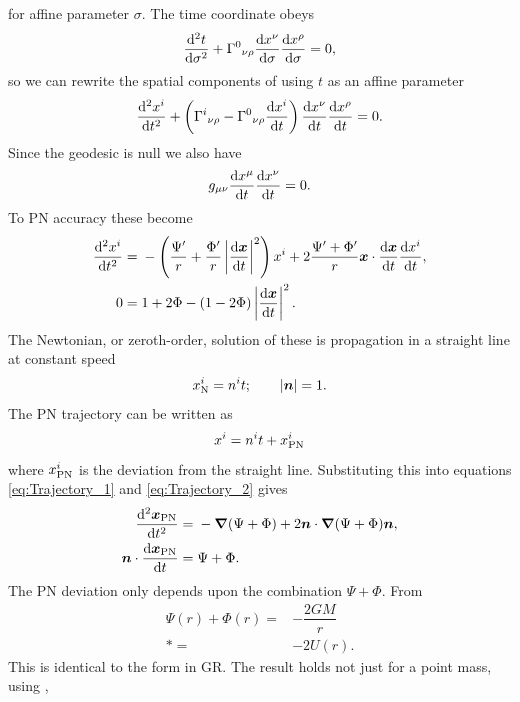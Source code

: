for affine parameter $\sigma$. The time coordinate obeys
\begin{equation}
\dfrac{\mathrm{d}^2 {t}}{\mathrm{d} {\sigma}^2} + {\Gamma^0}_{\nu\rho}\dfrac{\mathrm{d} {x^\nu}}{\mathrm{d} {\sigma}}\dfrac{\mathrm{d} {x^\rho}}{\mathrm{d} {\sigma}} = 0,
\end{equation}
so we can rewrite the spatial components of  using $t$ as an affine parameter \citep[section 6.1]{Will1993}
\begin{equation}
\dfrac{\mathrm{d}^2 {x^i}}{\mathrm{d} {t}^2} + \left({\Gamma^i}_{\nu\rho} - {\Gamma^0}_{\nu\rho}\dfrac{\mathrm{d} {x^i}}{\mathrm{d} {t}}\right)\dfrac{\mathrm{d} {x^\nu}}{\mathrm{d} {t}}\dfrac{\mathrm{d} {x^\rho}}{\mathrm{d} {t}} = 0.
\end{equation}
Since the geodesic is null we also have
\begin{equation}
g_{\mu\nu}\dfrac{\mathrm{d} {x^\mu}}{\mathrm{d} {t}}\dfrac{\mathrm{d} {x^\nu}}{\mathrm{d} {t}} = 0.
\end{equation}
To PN accuracy these become
\begin{align}
\label{eq:Trajectory_1}
\dfrac{\mathrm{d}^2 {x^i}}{\mathrm{d} {t}^2} = {} & -\left(\dfrac{\Psi'}{r} + \dfrac{\Phi'}{r}\left|\dfrac{\mathrm{d} {\boldsymbol{x}}}{\mathrm{d} {t}}\right|^2\right)x^i + 2\dfrac{\Psi' + \Phi'}{r}\boldsymbol{x}\cdot\dfrac{\mathrm{d} {\boldsymbol{x}}}{\mathrm{d} {t}}\dfrac{\mathrm{d} {x^i}}{\mathrm{d} {t}}, \\
0 = {} & 1 + 2\Phi - \left(1 - 2\Phi\right)\left|\dfrac{\mathrm{d} {\boldsymbol{x}}}{\mathrm{d} {t}}\right|^2.
\label{eq:Trajectory_2}
\end{align}
The Newtonian, or zeroth-order, solution of these is propagation in a straight line at constant speed \citep[section 6.1]{Will1993}
\begin{equation}
x^i_\mathrm{N} = n^it; \qquad |\boldsymbol{n}| = 1.
\end{equation}
The PN trajectory can be written as
\begin{equation}
x^i = n^it + x^i_\mathrm{PN}
\end{equation}
where $x^i_\mathrm{PN}$ is the deviation from the straight line. Substituting this into equations \eqref{eq:Trajectory_1} and \eqref{eq:Trajectory_2} gives
\begin{align}
\dfrac{\mathrm{d}^2 {\boldsymbol{x}_\mathrm{PN}}}{\mathrm{d} {t}^2} = {} & -\boldsymbol{\nabla}(\Psi + \Phi) + 2\boldsymbol{n}\cdot\boldsymbol{\nabla}(\Psi + \Phi)\boldsymbol{n}, \\
\boldsymbol{n}\cdot\dfrac{\mathrm{d} {\boldsymbol{x}_\mathrm{PN}}}{\mathrm{d} {t}} = {} & \Psi + \Phi.
\end{align}
The PN deviation only depends upon the combination $\Psi + \Phi$. From 
\begin{align}
\Psi(r) + \Phi(r) = {} & -\dfrac{2GM}{r} \nonumber \\*
 = {} & -2U(r).
\end{align}
This is identical to the form in GR. The result holds not just for a point mass, using ,
